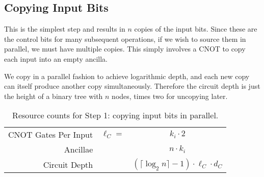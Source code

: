 \subsection{Copying Input Bits}
\label{subsec:copy}

This is the simplest step and results in $n$ copies of the input bits. Since
these are the control bits for many subsequent operations, if we wish to
source them in parallel, we must have multiple copies. This simply
involves a CNOT to copy each input into an empty ancilla.

We copy in a parallel fashion to achieve logarithmic depth, and each new
copy can itself produce another copy simultaneously. Therefore the circuit depth
is just the height of
a binary tree with $n$ nodes, times two for uncopying later.

\begin{table}
\begin{center}
\begin{tabular}{|r|cc|}
\hline
CNOT Gates Per Input &  $\ell_C = $ & $k_i \cdot 2$ \\
Ancillae & & $n\cdot k_i$\\
Circuit Depth & & $(\lceil \log_2 n \rceil - 1 )\cdot \ell_C \cdot d_C$\\
\hline
\end{tabular}
\caption{Resource counts for Step 1: copying input bits in parallel.}
\end{center}
\end{table}
